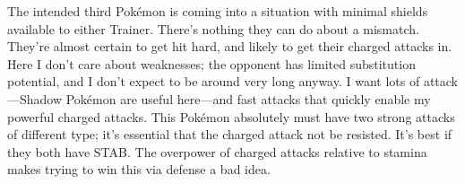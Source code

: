 The intended third Pokémon is coming into a situation with minimal shields available
 to either Trainer.
There's nothing they can do about a mismatch.
They're almost certain to get hit hard, and likely to get their charged attacks in.
Here I don't care about weaknesses; the opponent has limited substitution potential,
 and I don't expect to be around very long anyway.
I want lots of attack---Shadow Pokémon are useful here---and fast attacks that quickly enable my powerful charged attacks.
This Pokémon absolutely must have two strong attacks of different type; it's essential that the charged attack not be resisted.
It's best if they both have STAB\@.
The overpower of charged attacks relative to stamina makes trying to win this via defense a bad idea.

